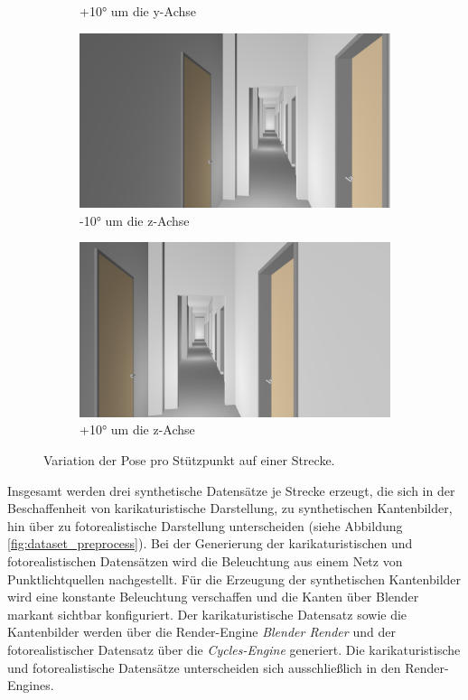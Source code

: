 \begin{figure}[H]
\begin{subfigure}[t]{0.18\linewidth}
		\caption{+10° um die y-Achse}
		\label{subfig:iz0_y+10}
	\end{subfigure}
	\hfill
	\begin{subfigure}[t]{0.18\linewidth}
		\centering
		\includegraphics[width=\linewidth]{images/syn_dataset/00024.png}
		\caption{-10° um die z-Achse}
		\label{subfig:iz-10_y0}
	\end{subfigure}
	\hfill
	\begin{subfigure}[t]{0.18\linewidth}
		\centering
		\includegraphics[width=\linewidth]{images/syn_dataset/00022.png}
		\caption{+10° um die z-Achse}
		\label{subfig:iz+10_y0}
	\end{subfigure}
	\caption{Variation der Pose pro Stützpunkt auf einer Strecke.}
	\label{fig:dataset_variation}
\end{figure}

Insgesamt werden drei synthetische Datensätze je Strecke erzeugt, die sich in der Beschaffenheit von karikaturistische Darstellung, zu synthetischen Kantenbilder, hin über zu fotorealistische Darstellung unterscheiden (siehe Abbildung \ref{fig:dataset_preprocess}). Bei der Generierung der karikaturistischen und fotorealistischen Datensätzen wird die Beleuchtung aus einem Netz von Punktlichtquellen nachgestellt.
Für die Erzeugung der synthetischen Kantenbilder wird eine konstante Beleuchtung verschaffen und die Kanten über Blender markant sichtbar konfiguriert. Der karikaturistische Datensatz sowie die Kantenbilder werden über die Render-Engine \textit{Blender Render} und der fotorealistischer Datensatz über die \textit{Cycles-Engine} generiert. Die karikaturistische und fotorealistische Datensätze unterscheiden sich ausschließlich in den Render-Engines.

